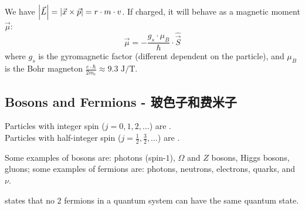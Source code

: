 We have $\abs{\vec{L}} = \abs{\vec{x} \times \vec{p}} = r \cdot m \cdot v$. If charged, it will behave as a magnetic moment $\vec{\mu}$:
$$\vec{\mu} = -\frac{g_s \cdot \mu_B}{\hbar} \cdot \hat{\vec{S}}$$
where $g_s$ is the gyromagnetic factor (different dependent on the particle), and $\mu_B$ is the Bohr magneton $\frac{e \cdot \hbar}{2m_e} \approx 9.3 \text{ J/T}$.

\subsection{Bosons and Fermions - 玻色子和费米子}
\begin{definition}
    Particles with integer spin ($j = 0, 1, 2, \dots$) are . \\
    Particles with half-integer spin ($j = \frac{1}{2}, \frac{3}{2}, \dots$) are .
\end{definition}
Some examples of bosons are: photons (spin-$1$), $\Omega$ and $Z$ bosons, Higgs bosons, gluons; some examples of fermions are: photons, neutrons, electrons, quarks, and $\nu$.
\begin{theorem}
     states that no $2$ fermions in a quantum system can have the same quantum state.
\end{theorem}

\newpage